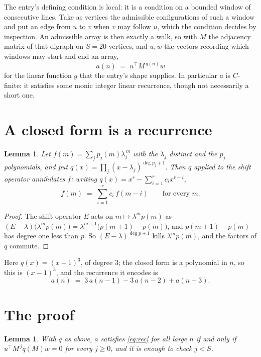 \documentclass[11pt,a4paper]{article}
\theoremstyle{plain}
\newtheorem{lemma}[theorem]{Lemma}
\theoremstyle{definition}
\begin{document}
The entry's defining condition is local: it is a condition on a bounded window of consecutive lines. Take as vertices the
admissible configurations of such a window and put an edge from $u$ to $v$ when $v$ may
follow $u$, which the condition decides by inspection. An admissible array is then exactly a
walk, so with $M$ the adjacency matrix of that digraph on $S=20$ vertices, and $u,w$ the
vectors recording which windows may start and end an array,
\[
a(n)\;=\;u^{\!\top}M^{\,g(n)}w
\]
for the linear function $g$ that the entry's shape supplies. In particular $a$ is
$C$-finite: it satisfies some monic integer linear recurrence, though not necessarily a short
one.

\section{A closed form is a recurrence}

\begin{lemma}\label{lem:ann}
Let $f(m)=\sum_{j}p_j(m)\lambda_j^{\,m}$ with the $\lambda_j$ distinct and the $p_j$
polynomials, and put $q(x)=\prod_j(x-\lambda_j)^{\deg p_j+1}$. Then $q$ applied to the shift
operator annihilates $f$: writing $q(x)=x^{r}-\sum_{i=1}^{r}c_ix^{r-i}$,
\[
f(m)\;=\;\sum_{i=1}^{r}c_i\,f(m-i)\qquad\text{for every }m.
\]
\end{lemma}

\begin{proof}
The shift operator $E$ acts on $m\mapsto\lambda^{m}p(m)$ as
$(E-\lambda)\bigl(\lambda^{m}p(m)\bigr)=\lambda^{m+1}\bigl(p(m+1)-p(m)\bigr)$, and
$p(m+1)-p(m)$ has degree one less than $p$. So $(E-\lambda)^{\deg p+1}$ kills
$\lambda^{m}p(m)$, and the factors of $q$ commute.
\end{proof}

Here $q(x)=(x-1)^{3}$, of degree $3$; the closed form is a polynomial in $n$, so this is $(x-1)^{3}$, and the recurrence it encodes is
\begin{equation}\label{eq:rec}
a(n)\;=\;3\,a(n-1) - 3\,a(n-2) + a(n-3).
\end{equation}

\section{The proof}

\begin{lemma}\label{lem:crit}
With $q$ as above, $a$ satisfies \eqref{eq:rec} for all large $n$ if and only if
$u^{\!\top}M^{\,j}q(M)w=0$ for every $j\ge0$, and it is enough to check $j<S$.
\end{lemma}
\end{document}
